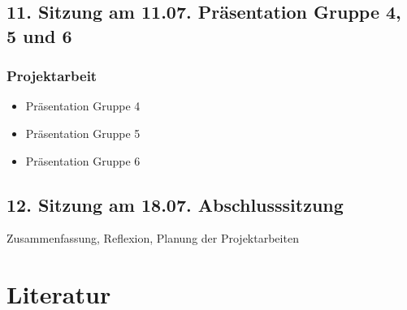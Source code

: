 \documentclass[
  ngerman,
]{article}
\providecommand{\tightlist}{%
  \setlength{\itemsep}{0pt}\setlength{\parskip}{0pt}}
\begin{document}
\hypertarget{sitzung-am-11.07.-pruxe4sentation-gruppe-4-5-und-6}{%
\subsection*{11. Sitzung am 11.07. \textbar{} Präsentation Gruppe 4, 5 und 6}\label{sitzung-am-11.07.-pruxe4sentation-gruppe-4-5-und-6}}

\hypertarget{projektarbeit-8}{%
\subsubsection*{Projektarbeit}\label{projektarbeit-8}}

\begin{itemize}
\tightlist
\item
  Präsentation Gruppe 4
\item
  Präsentation Gruppe 5
\item
  Präsentation Gruppe 6
\end{itemize}

\hypertarget{sitzung-am-18.07.-abschlusssitzung}{%
\subsection*{12. Sitzung am 18.07. \textbar{} Abschlusssitzung}\label{sitzung-am-18.07.-abschlusssitzung}}

Zusammenfassung, Reflexion, Planung der Projektarbeiten

\hypertarget{literatur}{%
\section*{Literatur}\label{literatur}}
\end{document}
